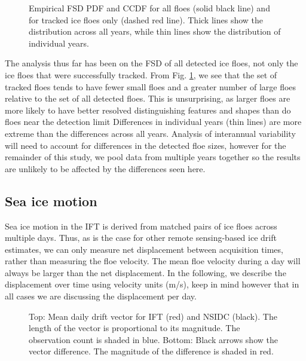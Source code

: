 \documentclass[aog]{igs}
\begin{document}
\begin{figure}[!ht]
\caption{Empirical FSD PDF and CCDF for all floes (solid black line) and for tracked ice floes only (dashed red line). Thick lines show the distribution across all years, while thin lines show the distribution of individual years.}
\label{fig:fsd_tracked}
\end{figure}

The analysis thus far has been on the FSD of all detected ice floes, not only the ice floes that were successfully tracked. From Fig. \ref{fig:fsd_tracked}, we see that the set of tracked floes tends to have fewer small floes and a greater number of large floes relative to the set of all detected floes. This is unsurprising, as larger floes are more likely to have better resolved distinguishing features and shapes than do floes near the detection limit
Differences in individual years (thin lines) are more extreme than the differences across all years. Analysis of interannual variability will need to account for differences in the detected floe sizes, however for the remainder of this study, we pool data from multiple years together so the results are unlikely to be affected by the differences seen here. 

\subsection{Sea ice motion}
Sea ice motion in the IFT is derived from matched pairs of ice floes across multiple days.
Thus, as is the case for other remote sensing-based ice drift estimates, we can only measure net displacement between acquisition times, rather than measuring the floe velocity. The mean floe velocity during a day will always be larger than the net displacement.
In the following, we describe the displacement over time using velocity units (m/s), keep in mind however that in all cases we are discussing the displacement per day.


\begin{figure*}
\caption{Top: Mean daily drift vector for IFT (red) and NSIDC (black). The length of the vector is proportional to its magnitude. The observation count is shaded in blue. Bottom: Black arrows show the vector difference. The magnitude of the difference is shaded in red.}
\label{fig:mean_drift}
\end{figure*}
\end{document}
